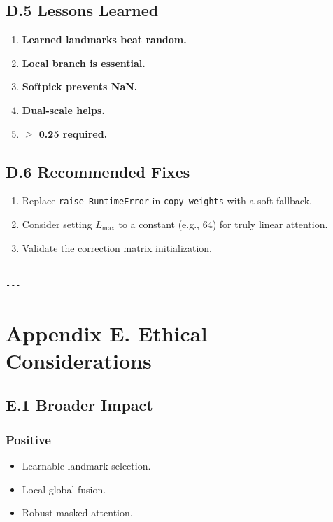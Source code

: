 \subsection{D.5 Lessons Learned}

\begin{enumerate}
\item \textbf{Learned landmarks beat random.}
\item \textbf{Local branch is essential.}
\item \textbf{Softpick prevents NaN.}
\item \textbf{Dual-scale helps.}
\item \textbf{  $\ge$ 0.25 required.}

\end{enumerate}
\subsection{D.6 Recommended Fixes}

\begin{enumerate}
\item Replace \texttt{raise RuntimeError} in \texttt{copy\_weights} with a soft fallback.
\item Consider setting $L_\text{max}$ to a constant (e.g., 64) for truly
  linear attention.
\item Validate the correction matrix initialization.
\end{enumerate}
\begin{lstlisting}

---
\end{lstlisting}

\section{Appendix E. Ethical Considerations}

\subsection{E.1 Broader Impact}

\subsubsection{Positive}
\begin{itemize}
\item Learnable landmark selection.
\item Local-global fusion.
\item Robust masked attention.

\end{itemize}
